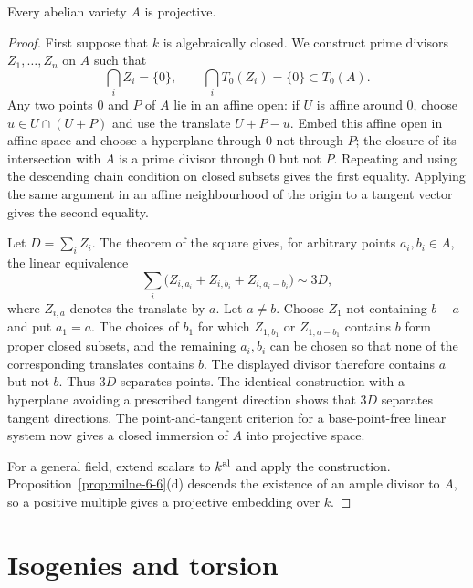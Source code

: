 \begin{theorem}
\label{thm:milne-abelian-projective}

Every abelian variety $A$ is projective.
\end{theorem}

\begin{proof}
First suppose that $k$ is algebraically closed.  We construct prime divisors
$Z_1,\ldots,Z_n$ on $A$ such that
\[
 \bigcap_i Z_i=\{0\},\qquad \bigcap_iT_0(Z_i)=\{0\}
 \subset T_0(A).
\]
Any two points $0$ and $P$ of $A$ lie in an affine open: if $U$ is affine
around $0$, choose $u\in U\cap(U+P)$ and use the translate
$U+P-u$.  Embed this affine open in affine space and choose a hyperplane
through $0$ not through $P$; the closure of its intersection with $A$ is a
prime divisor through $0$ but not $P$.  Repeating and using the descending
chain condition on closed subsets gives the first equality.  Applying the same
argument in an affine neighbourhood of the origin to a tangent vector gives
the second equality.

Let $D=\sum_iZ_i$.  The theorem of the square gives, for arbitrary points
$a_i,b_i\in A$, the linear equivalence
\[
 \sum_i\bigl(Z_{i,a_i}+Z_{i,b_i}+Z_{i,a_i-b_i}\bigr)\sim3D,
\]
where $Z_{i,a}$ denotes the translate by $a$.  Let $a\ne b$.  Choose $Z_1$
not containing $b-a$ and put $a_1=a$.  The choices of $b_1$ for which
$Z_{1,b_1}$ or $Z_{1,a-b_1}$ contains $b$ form proper closed subsets, and the
remaining $a_i,b_i$ can be chosen so that none of the corresponding translates
contains $b$.  The displayed divisor therefore contains $a$ but not $b$.
Thus $3D$ separates points.  The identical construction with a hyperplane
avoiding a prescribed tangent direction shows that $3D$ separates tangent
directions.  The point-and-tangent criterion for a base-point-free linear
system now gives a closed immersion of $A$ into projective space.

For a general field, extend scalars to $k^{\rm al}$ and apply the construction.
Proposition~\ref{prop:milne-6-6}(d) descends the existence of an ample divisor
to $A$, so a positive multiple gives a projective embedding over $k$.
\end{proof}

\section{Isogenies and torsion}

